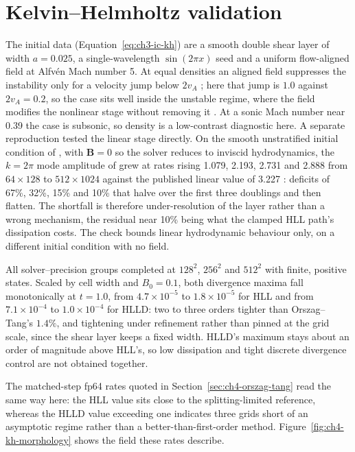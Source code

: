 \section{Kelvin--Helmholtz validation}
\label{sec:ch4-kelvin-helmholtz}

The initial data (Equation~\ref{eq:ch3-ic-kh}) are a smooth double shear layer
of width $a=0.025$, a single-wavelength $\sin(2\pi x)$ seed and a uniform
flow-aligned field at Alfv\'en Mach number 5. At equal densities an aligned
field suppresses the instability only for a velocity jump below $2v_A$
\citep{chandrasekhar1961stability}; here that jump is $1.0$ against
$2v_A=0.2$, so the case sits well inside the unstable regime, where the field
modifies the nonlinear stage without removing it \citep{frankEtAl1996kh}. At a
sonic Mach number near 0.39 the case is subsonic, so density is a low-contrast
diagnostic here. A
separate reproduction tested the linear stage directly. On the smooth
unstratified initial condition of \citet{lecoanetEtAl2016kh}, with
$\mathbf{B}=0$ so the solver reduces to inviscid hydrodynamics, the $k=2\pi$
mode amplitude of \citet{tricco2019kh} grew at rates rising 1.079, 2.193, 2.731
and 2.888 from $64\times128$ to $512\times1024$ against the published linear
value of 3.227 \citep{berlokPfrommer2019kh}: deficits of 67\%, 32\%, 15\% and
10\% that halve over the first three doublings and then flatten. The shortfall
is therefore under-resolution of the layer rather than a wrong mechanism, the
residual near 10\% being what the clamped HLL path's dissipation costs. The
check bounds linear hydrodynamic behaviour only, on a different initial
condition with no field.

All solver--precision groups completed at $128^2$, $256^2$ and $512^2$ with
finite, positive states. Scaled by cell width and $B_0=0.1$, both divergence
maxima fall monotonically at $t=1.0$, from $4.7\times10^{-5}$ to
$1.8\times10^{-5}$ for HLL and from $7.1\times10^{-4}$ to $1.0\times10^{-4}$ for
HLLD: two to three orders tighter than Orszag--Tang's $1.4\%$, and tightening
under refinement rather than pinned at the grid scale, since the shear layer
keeps a fixed width. HLLD's maximum stays about an order of magnitude above
HLL's, so low dissipation and tight discrete divergence control are not obtained
together.

The matched-step fp64 rates quoted in Section~\ref{sec:ch4-orszag-tang} read the
same way here: the HLL value sits close to the splitting-limited reference,
whereas the HLLD value exceeding one indicates three grids short of an
asymptotic regime rather than a better-than-first-order method.
Figure~\ref{fig:ch4-kh-morphology} shows the field these rates describe.

